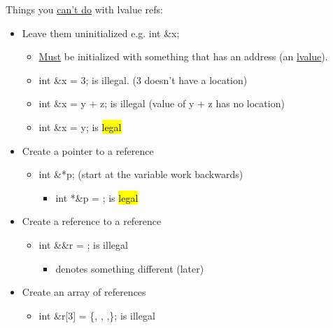 \documentclass{article}
\begin{document}
Things you \underline{can't do} with lvalue refs: 
\begin{itemize}
    \item Leave them uninitialized e.g. int \&x;
    \begin{itemize}
        \item \underline{Must} be initialized with something that has an address (an \underline{lvalue}).
    \end{itemize}
    \begin{itemize}
        \begin{itemize}
            \item int \&x = 3; is illegal. (3 doesn't have a location)
        \end{itemize}
        \begin{itemize}
            \item int \&x = y + z; is illegal (value of y + z has no location)
        \end{itemize}
        \begin{itemize}
            \item int \&x = y; is \hl{legal}
        \end{itemize}
    \end{itemize}
    \item Create a pointer to a reference
    \begin{itemize}
        \item int \&*p; (start at the variable work backwards)
        \begin{itemize}
            \item int *\&p = ; is \hl{legal}
        \end{itemize}
    \end{itemize}
    \item Create a reference to a reference
    \begin{itemize}
        \item int \&\&r = ; is illegal
        \begin{itemize}
            \item denotes something different (later)
        \end{itemize}
    \end{itemize}
    \item Create an array of references
    \begin{itemize}
        \item int \&r[3] = \{, , ,\}; is illegal
    \end{itemize}
\end{itemize}
\end{document}
